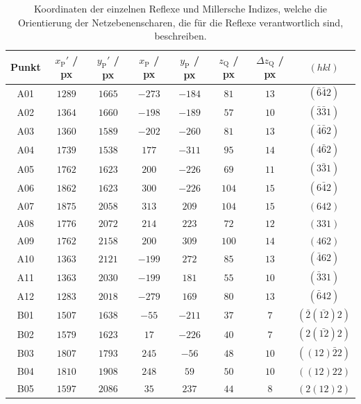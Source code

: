 \begin{table}[H]
    \centering
    \caption{Koordinaten der einzelnen Reflexe und Millersche Indizes, welche die Orientierung der Netzebenenscharen, die für die
    Reflexe verantwortlich sind, beschreiben.}
    \begin{tabular}{c|c|c|c|c|c|c|c}
        Punkt & $x_{\mathrm{P}}'$ / px & $y_{\mathrm{P}}'$ / px & $x_{\mathrm{P}}$ / px & $y_{\mathrm{P}}$ / px & $z_{\mathrm{Q}}$ / px & $\Delta z_{\mathrm{Q}}$ / px & $(hkl)$ \\
        \hline
        A01 & $1289$ & $1665$ & $-273$ & $-184$ & $ 81$ & $13$ & $(\bar{6}\bar{4}2)$ \\
        A02 & $1364$ & $1660$ & $-198$ & $-189$ & $ 57$ & $10$ & $(\bar{3}\bar{3}1)$ \\
        A03 & $1360$ & $1589$ & $-202$ & $-260$ & $ 81$ & $13$ & $(\bar{4}\bar{6}2)$ \\
        A04 & $1739$ & $1538$ & $ 177$ & $-311$ & $ 95$ & $14$ & $(4\bar{6}2)$ \\
        A05 & $1762$ & $1623$ & $ 200$ & $-226$ & $ 69$ & $11$ & $(3\bar{3}1)$ \\
        A06 & $1862$ & $1623$ & $ 300$ & $-226$ & $104$ & $15$ & $(6\bar{4}2)$ \\
        A07 & $1875$ & $2058$ & $ 313$ & $ 209$ & $104$ & $15$ & $(642)$ \\
        A08 & $1776$ & $2072$ & $ 214$ & $ 223$ & $ 72$ & $12$ & $(331)$ \\
        A09 & $1762$ & $2158$ & $ 200$ & $ 309$ & $100$ & $14$ & $(462)$ \\
        A10 & $1363$ & $2121$ & $-199$ & $ 272$ & $ 85$ & $13$ & $(\bar{4}62)$ \\
        A11 & $1363$ & $2030$ & $-199$ & $ 181$ & $ 55$ & $10$ & $(\bar{3}31)$ \\
        A12 & $1283$ & $2018$ & $-279$ & $ 169$ & $ 80$ & $13$ & $(\bar{6}42)$ \\
        B01 & $1507$ & $1638$ & $ -55$ & $-211$ & $ 37$ & $ 7$ & $(\bar{2}(\bar{12})2)$ \\
        B02 & $1579$ & $1623$ & $  17$ & $-226$ & $ 40$ & $ 7$ & $(2(\bar{12})2)$ \\
        B03 & $1807$ & $1793$ & $ 245$ & $ -56$ & $ 48$ & $10$ & $((12)\bar{2}2)$ \\
        B04 & $1810$ & $1908$ & $ 248$ & $  59$ & $ 50$ & $10$ & $((12)22)$ \\
        B05 & $1597$ & $2086$ & $  35$ & $ 237$ & $ 44$ & $ 8$ & $(2(12)2)$ \\

\end{tabular}
\end{table}
